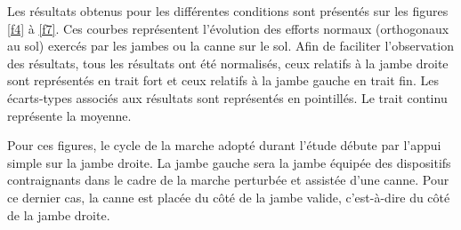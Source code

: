 Les résultats obtenus pour les différentes conditions sont présentés sur les figures \ref{f4} à \ref{f7}. Ces courbes représentent l'évolution des efforts normaux (orthogonaux au sol) exercés par les jambes ou la canne sur le sol. Afin de faciliter l'observation des résultats, tous les résultats ont été normalisés, ceux relatifs à la jambe droite sont représentés en trait fort et ceux relatifs à la jambe gauche en trait fin. Les écarts-types associés aux résultats sont représentés en pointillés. Le trait continu représente la moyenne.

Pour ces figures, le cycle de la marche adopté durant l'étude débute par l'appui simple sur la jambe droite. La jambe gauche sera la jambe équipée des dispositifs contraignants dans le cadre de la marche perturbée et assistée d'une canne. Pour ce dernier cas, la canne est placée du côté de la jambe valide, c'est-à-dire du côté de la jambe droite.



